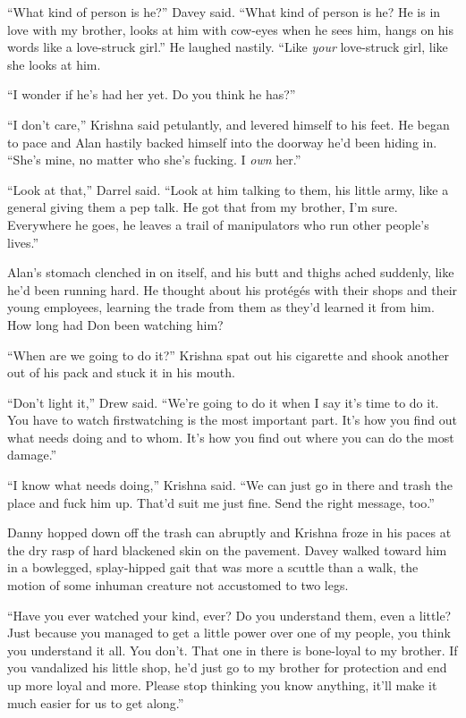 ``What kind of person is he?'' Davey said.  ``What kind of person is
he?  He is in love with my brother, looks at him with cow-eyes when he
sees him, hangs on his words like a love-struck girl.'' He laughed
nastily.  ``Like \textit{your} love-struck girl, like she looks at
him.

``I wonder if he's had her yet.  Do you think he has?''

``I don't care,'' Krishna said petulantly, and levered himself to his
feet.  He began to pace and Alan hastily backed himself into the
doorway he'd been hiding in.  ``She's mine, no matter who she's
fucking.  I \textit{own} her.''

``Look at that,'' Darrel said.  ``Look at him talking to them, his
little army, like a general giving them a pep talk.  He got that from
my brother, I'm sure.  Everywhere he goes, he leaves a trail of
manipulators who run other people's lives.''

Alan's stomach clenched in on itself, and his butt and thighs ached
suddenly, like he'd been running hard.  He thought about his
prot\'{e}g\'{e}s with their shops and their young employees, learning
the trade from them as they'd learned it from him.  How long had Don
been watching him?

``When are we going to do it?'' Krishna spat out his cigarette and
shook another out of his pack and stuck it in his mouth.

``Don't light it,'' Drew said.  ``We're going to do it when I say it's
time to do it.  You have to watch first\dash{}watching is the most
important part.  It's how you find out what needs doing and to whom. 
It's how you find out where you can do the most damage.''

``I know what needs doing,'' Krishna said.  ``We can just go in there
and trash the place and fuck him up.  That'd suit me just fine.  Send
the right message, too.''

Danny hopped down off the trash can abruptly and Krishna froze in his
paces at the dry rasp of hard blackened skin on the pavement.  Davey
walked toward him in a bowlegged, splay-hipped gait that was more a
scuttle than a walk, the motion of some inhuman creature not
accustomed to two legs.

``Have you ever watched your kind, ever?  Do you understand them, even
a little?  Just because you managed to get a little power over one of
my people, you think you understand it all.  You don't.  That one in
there is bone-loyal to my brother.  If you vandalized his little shop,
he'd just go to my brother for protection and end up more loyal and
more.  Please stop thinking you know anything, it'll make it much
easier for us to get along.''

